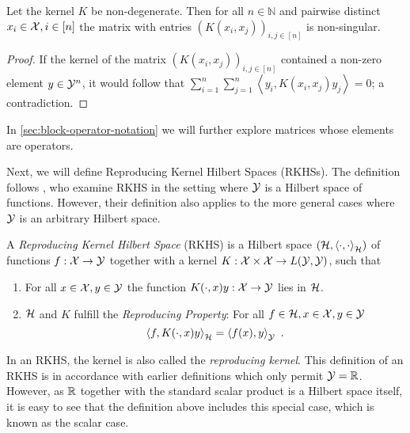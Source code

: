 \begin{lemma}
	\label{lem:kernel-non-singular}
	Let the kernel $K$ be non-degenerate.
	Then for all $n \in \mathbb{N}$ and pairwise distinct $x_i \in \mathcal{X}, i \in [n]$ the matrix with entries $(K(x_i, x_j))_{i, j \in [n]}$ is non-singular.
\end{lemma}
\begin{proof}
	If the kernel of the matrix $(K(x_i, x_j))_{i, j \in [n]}$ contained a non-zero element $y \in \mathcal{Y}^n$, it would follow that $\sum_{i=1}^n \sum_{j=1}^n \left< y_i, K(x_i, x_j)  y_j\right> = 0$; a contradiction.
\end{proof}
In \cref{sec:block-operator-notation} we will further explore matrices whose elements are operators.

Next, we will define Reproducing Kernel Hilbert Spaces (RKHSs).
The definition follows \citet{kadri16}, who examine RKHS in the setting where $\mathcal{Y}$ is a Hilbert space of functions.
However, their definition also applies to the more general cases where $\mathcal{Y}$ is an arbitrary Hilbert space.
\begin{definition}
	\label{def:rkhs}
	A \emph{Reproducing Kernel Hilbert Space} (RKHS) is a Hilbert space $(\mathcal{H}, \left<\cdot, \cdot\right>_{\mathcal{H}})$ of functions $f: \mathcal{X} \rightarrow \mathcal{Y}$ together with a kernel $K: \mathcal{X} \times \mathcal{X} \rightarrow L(\mathcal{Y}, \mathcal{Y})$, such that
	\begin{enumerate}
		\item For all $x\in \mathcal{X}, y \in \mathcal{Y}$ the function $K(\cdot, x) y: \mathcal{X} \rightarrow \mathcal{Y}$ lies in $\mathcal{H}$.
		\item $\mathcal{H}$ and $K$ fulfill the \emph{Reproducing Property}: For all $f \in \mathcal{H}, x \in \mathcal{X}, y \in \mathcal{Y}$
		\begin{equation}
			\label{eq:reproducing-property}
			\left< f, K(\cdot, x) y \right>_{\mathcal{H}} = \left< f(x), y\right>_{\mathcal{Y}} \ .
		\end{equation}
	\end{enumerate}
\end{definition}
In an RKHS, the kernel is also called the \emph{reproducing kernel}.
This definition of an RKHS is in accordance with earlier definitions \cite{berlinet04, sejdinovic12} which only permit $\mathcal{Y} = \mathbb{R}$.
However, as $\mathbb{R}$ together with the standard scalar product is a Hilbert space itself, it is easy to see that the definition above includes this special case, which is known as the scalar case.

